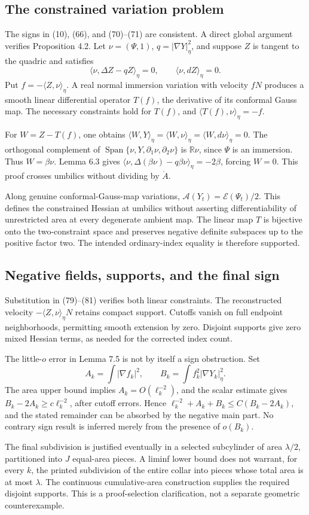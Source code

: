 \documentclass[10pt]{article}
\begin{document}
\subsection*{The constrained variation problem}
The signs in (10), (66), and (70)–(71) are consistent. A direct global argument verifies Proposition 4.2. Let \(\nu=(\Psi,1)\), \(q=|\nabla Y|_\eta^2\), and suppose \(Z\) is tangent to the quadric and satisfies \[\langle \nu,\Delta Z-qZ\rangle_\eta=0,\qquad \langle \nu,dZ\rangle_\eta=0.\] Put \(f=-\langle Z,\nu\rangle_\eta\). A real normal immersion variation with velocity \(fN\) produces a smooth linear differential operator \(T(f)\), the derivative of its conformal Gauss map. The necessary constraints hold for \(T(f)\), and \(\langle T(f),\nu\rangle_\eta=-f\).\par
For \(W=Z-T(f)\), one obtains \(\langle W,Y\rangle_\eta=\langle W,\nu\rangle_\eta=\langle W,d\nu\rangle_\eta=0\). The orthogonal complement of \(\operatorname{Span}\{\nu,Y,\partial_1\nu,\partial_2\nu\}\) is \(\mathbb R\nu\), since \(\Psi\) is an immersion. Thus \(W=\beta\nu\). Lemma 6.3 gives \(\langle \nu,\Delta(\beta\nu)-q\beta\nu\rangle_\eta=-2\beta\), forcing \(W=0\). This proof crosses umbilics without dividing by \(\mathring A\).\par
Along genuine conformal-Gauss-map variations, \(\mathcal A(Y_t)=\mathcal E(\Psi_t)/2\). This defines the constrained Hessian at umbilics without asserting differentiability of unrestricted area at every degenerate ambient map. The linear map \(T\) is bijective onto the two-constraint space and preserves negative definite subspaces up to the positive factor two. The intended ordinary-index equality is therefore supported.\par
\subsection*{Negative fields, supports, and the final sign}
Substitution in (79)–(81) verifies both linear constraints. The reconstructed velocity \(-\langle Z,\nu \rangle_\eta N\) retains compact support. Cutoffs vanish on full endpoint neighborhoods, permitting smooth extension by zero. Disjoint supports give zero mixed Hessian terms, as needed for the corrected index count.\par
The little-\(o\) error in Lemma 7.5 is not by itself a sign obstruction. Set \[A_k=\int|\nabla f_k|^2,\qquad
 B_k=\int f_k^2|\nabla Y_k|_\eta^2 .\] The area upper bound implies \(A_k=O(\ell_k^{-2})\), and the scalar estimate gives \(B_k-2A_k\ge c\ell_k^{-2}\), after cutoff errors. Hence \(\ell_k^{-2}+A_k+B_k\le C(B_k-2A_k)\), and the stated remainder can be absorbed by the negative main part. No contrary sign result is inferred merely from the presence of \(o(B_k)\).\par
The final subdivision is justified eventually in a selected subcylinder of area \(\lambda/2\), partitioned into \(J\) equal-area pieces. A liminf lower bound does not warrant, for every \(k\), the printed subdivision of the entire collar into pieces whose total area is at most \(\lambda\). The continuous cumulative-area construction supplies the required disjoint supports. This is a proof-selection clarification, not a separate geometric counterexample.\par
\end{document}
